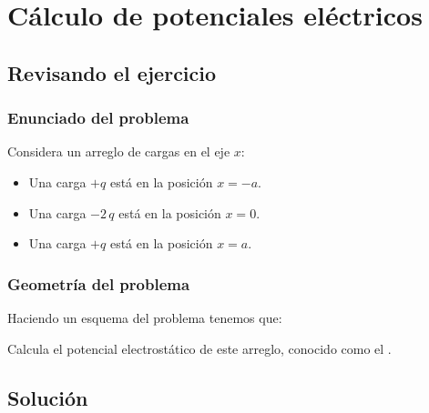 \documentclass[12pt]{beamer}
\begin{document}
\section{Cálculo de potenciales eléctricos}
\subsection{Revisando el ejercicio}

\begin{frame}
\frametitle{Enunciado del problema}
Considera un arreglo de cargas en el eje $x$:
\pause
\begin{itemize}[<+->]
\item Una carga $+q$ está en la posición $x = -a$.
\item Una carga $-2 \, q$ está en la posición $x = 0$.
\item Una carga $+q$ está en la posición $x = a$.
\end{itemize}
\end{frame}
\begin{frame}
\frametitle{Geometría del problema}
Haciendo un esquema del problema tenemos que:
\pause
\begin{figure}
    \centering
    
\end{figure}
\pause
Calcula el potencial electrostático de este arreglo, conocido como el .
\end{frame}

\subsection{Solución}
\end{document}
